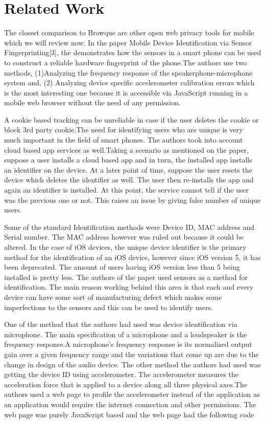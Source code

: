 \documentclass[journal]{IEEEtran}
\begin{document}
\section*{Related Work}

The closest comparison to Browque are other open web privacy tools for mobile
which we will review now. In the paper Mobile Device Identification via Sensor
Fingerprinting[3], the demonstrates how the sensors in a smart phone can be used
to construct a reliable hardware fingerprint of the phone.The authors use two
methods, (1)Analyzing the frequency response of the speakerphone-microphone
system and, (2) Analyzing device specific accelerometer calibration errors which
is the most interesting one because it is accessible via JavaScript running in a mobile
web browser without the need of any permission. 

A cookie based tracking can be unreliable in case if the user deletes the cookie
or block 3rd party cookie.The need for identifying users who are unique is very
much important in the field of smart phones. The authors took into account cloud
based app services as well.Taking a scenario as mentioned on the paper, suppose
a user installs a cloud based app and in turn, the installed app installs an
identifier on the device. At a later point of time, suppose the user resets the
device which deletes the identifier as well. The user then re-installs the app
and again an identifier is installed. At this point, the service cannot tell if
the user was the previous one or not. This raises an issue by giving false
number of unique users.

Some of the standard Identification methods were Device ID, MAC address and
Serial number. The MAC address however was ruled out because it could be
altered. In the case of iOS devices, the unique device identifier is the primary
method for the identification of an iOS device, however since iOS version 5, it
has been deprecated. The amount of users having iOS version less than 5 being
installed is pretty less. The authors of the paper used sensors as a method for
identification. The main reason working behind this area is that each and every
device can have some sort of manufacturing defect which makes some imperfections
to the sensors and this can be used to identify users.

One of the method that the authors had used was device identification via
microphone. The main specification of a microphone and a loudspeaker is the
frequency response.A microphone’s frequency response is its normalized output
gain over a given frequency range and the variations that come up are due to the
change in design of the audio device. The other method the authors had used was
getting the device ID using accelerometer. The accelerometer measures the
acceleration force that is applied to a device along all three physical axes.The
authors used a web page to profile the accelerometer instead of the application
as an application would require the internet connection and other permissions.
The web page was purely JavaScript based and the web page had the following code
\end{document}
